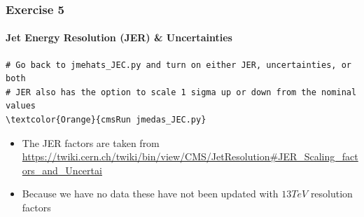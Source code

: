 \begin{frame}[fragile]
	\frametitle{Exercise 5}
	\framesubtitle{Jet Energy Resolution (JER) \& Uncertainties}

\begin{Verbatim}[label={Exercise 5}]
# Go back to jmehats_JEC.py and turn on either JER, uncertainties, or both
# JER also has the option to scale 1 sigma up or down from the nominal values
\textcolor{Orange}{cmsRun jmedas_JEC.py}
\end{Verbatim}

\begin{block}{}
	\begin{itemize}
		\item The JER factors are taken from \href{https://twiki.cern.ch/twiki/bin/view/CMS/JetResolution#JER_Scaling_factors_and_Uncertai}{https://twiki.cern.ch/twiki/bin/view/CMS/JetResolution\#JER\_Scaling\_factors\_and\_Uncertai}
		\item Because we have no data these have not been updated with $13\unit{TeV}$ resolution factors
	\end{itemize}
\end{block}

\end{frame}



